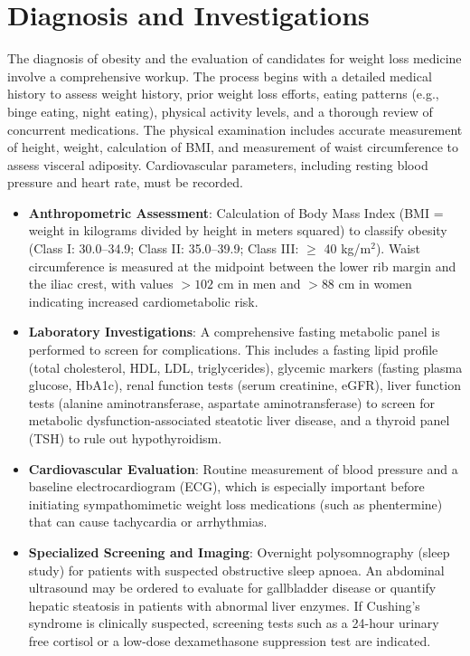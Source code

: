 \section*{Diagnosis and Investigations}
The diagnosis of obesity and the evaluation of candidates for weight loss medicine involve a comprehensive workup. The process begins with a detailed medical history to assess weight history, prior weight loss efforts, eating patterns (e.g., binge eating, night eating), physical activity levels, and a thorough review of concurrent medications. The physical examination includes accurate measurement of height, weight, calculation of BMI, and measurement of waist circumference to assess visceral adiposity. Cardiovascular parameters, including resting blood pressure and heart rate, must be recorded.

\begin{itemize}
\item \textbf{Anthropometric Assessment}: Calculation of Body Mass Index (BMI = weight in kilograms divided by height in meters squared) to classify obesity (Class I: 30.0--34.9; Class II: 35.0--39.9; Class III: $\ge$ 40 kg/m$^2$). Waist circumference is measured at the midpoint between the lower rib margin and the iliac crest, with values $>102$ cm in men and $>88$ cm in women indicating increased cardiometabolic risk.
\item \textbf{Laboratory Investigations}: A comprehensive fasting metabolic panel is performed to screen for complications. This includes a fasting lipid profile (total cholesterol, HDL, LDL, triglycerides), glycemic markers (fasting plasma glucose, HbA1c), renal function tests (serum creatinine, eGFR), liver function tests (alanine aminotransferase, aspartate aminotransferase) to screen for metabolic dysfunction-associated steatotic liver disease, and a thyroid panel (TSH) to rule out hypothyroidism.
\item \textbf{Cardiovascular Evaluation}: Routine measurement of blood pressure and a baseline electrocardiogram (ECG), which is especially important before initiating sympathomimetic weight loss medications (such as phentermine) that can cause tachycardia or arrhythmias.
\item \textbf{Specialized Screening and Imaging}: Overnight polysomnography (sleep study) for patients with suspected obstructive sleep apnoea. An abdominal ultrasound may be ordered to evaluate for gallbladder disease or quantify hepatic steatosis in patients with abnormal liver enzymes. If Cushing's syndrome is clinically suspected, screening tests such as a 24-hour urinary free cortisol or a low-dose dexamethasone suppression test are indicated.
\end{itemize}

